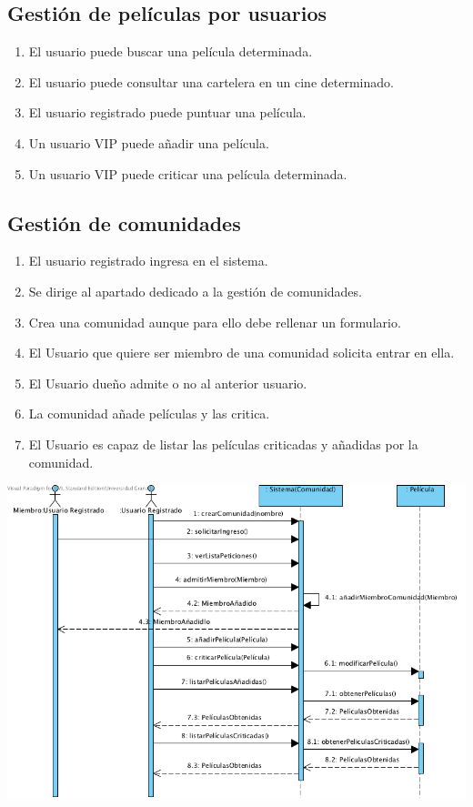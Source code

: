 \documentclass{article}
\begin{document}
	\subsection*{Gestión de películas por usuarios}
	\begin{enumerate}
		\item El usuario puede buscar una película determinada.
    		\item El usuario puede consultar una cartelera en un cine determinado.
    		\item El usuario registrado puede puntuar una película.
    		\item Un usuario VIP puede añadir una película.
    		\item Un usuario VIP puede criticar una película determinada.
	\end{enumerate}
	\subsection*{Gestión de comunidades}
	\begin{enumerate}
		\item El usuario registrado ingresa en el sistema.
		\item Se dirige al apartado dedicado a la gestión de comunidades.
		\item Crea una comunidad aunque para ello debe rellenar un formulario.
		\item El Usuario que quiere ser miembro de una comunidad solicita entrar en ella.
		\item El Usuario dueño admite o no al anterior usuario.
		\item La comunidad añade películas y las critica.
		\item El Usuario es capaz de listar las películas criticadas y añadidas por la comunidad.
	\end{enumerate}
		\includegraphics[width=1\linewidth]{./S-Comunidades}
\end{document}
